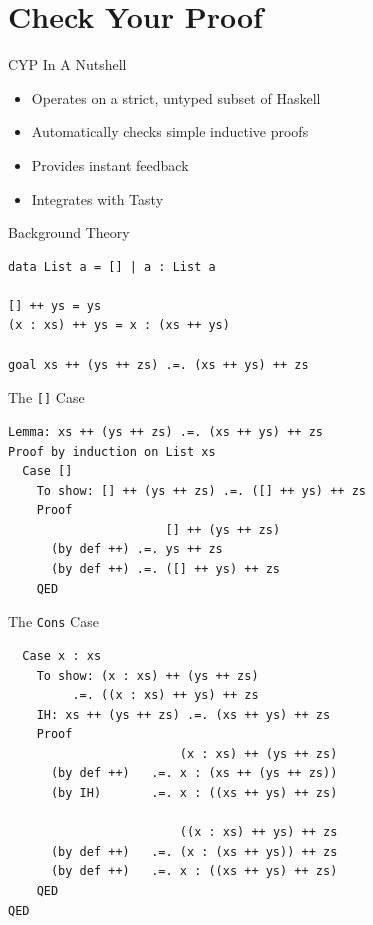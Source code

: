 \documentclass{beamer}
\begin{document}
\section{Check Your Proof}

\begin{frame}{CYP In A Nutshell}

\begin{itemize}[<+->]
  \item Operates on a strict, untyped subset of Haskell
  \item Automatically checks simple inductive proofs
  \item Provides instant feedback
  \item Integrates with Tasty
\end{itemize}
\end{frame}

\begin{frame}[fragile]{Background Theory}
\lstset{language=CYP}
  \begin{lstlisting}
data List a = [] | a : List a

[] ++ ys = ys
(x : xs) ++ ys = x : (xs ++ ys)

goal xs ++ (ys ++ zs) .=. (xs ++ ys) ++ zs
  \end{lstlisting}
\end{frame}

\begin{frame}[fragile]{The \texttt{[]} Case}
  \begin{lstlisting}
Lemma: xs ++ (ys ++ zs) .=. (xs ++ ys) ++ zs
Proof by induction on List xs
  Case []
    To show: [] ++ (ys ++ zs) .=. ([] ++ ys) ++ zs
    Proof
                      [] ++ (ys ++ zs)
      (by def ++) .=. ys ++ zs
      (by def ++) .=. ([] ++ ys) ++ zs
    QED
  \end{lstlisting}
\end{frame}

\begin{frame}[fragile]{The \texttt{Cons} Case}
  \begin{lstlisting}
  Case x : xs
    To show: (x : xs) ++ (ys ++ zs)
         .=. ((x : xs) ++ ys) ++ zs
    IH: xs ++ (ys ++ zs) .=. (xs ++ ys) ++ zs
    Proof
                        (x : xs) ++ (ys ++ zs)
      (by def ++)   .=. x : (xs ++ (ys ++ zs))
      (by IH)       .=. x : ((xs ++ ys) ++ zs)

                        ((x : xs) ++ ys) ++ zs
      (by def ++)   .=. (x : (xs ++ ys)) ++ zs
      (by def ++)   .=. x : ((xs ++ ys) ++ zs)
    QED
QED
  \end{lstlisting}
\end{frame}
\end{document}
